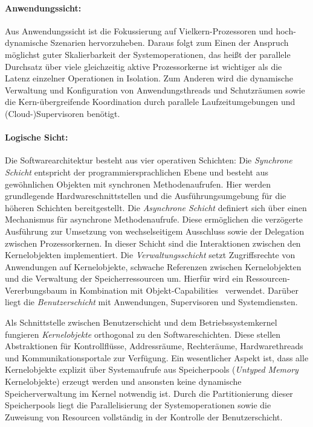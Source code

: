 \paragraph{Anwendungssicht:}
Aus Anwendungssicht ist die Fokussierung auf Vielkern-Prozessoren und hoch-dynamische Szenarien hervorzuheben. Daraus folgt zum Einen der Anspruch möglichst guter Skalierbarkeit der Systemoperationen, das heißt der parallele Durchsatz über viele gleichzeitig aktive Prozessorkerne ist wichtiger als die Latenz einzelner Operationen in Isolation. Zum Anderen wird die dynamische Verwaltung und Konfiguration von Anwendungsthreads und Schutzräumen sowie die Kern-übergreifende Koordination durch parallele Laufzeitumgebungen und (Cloud-)Supervisoren benötigt.

\paragraph{Logische Sicht:}
Die Softwarearchitektur besteht aus vier operativen Schichten: Die \emph{Synchrone Schicht} entspricht der programmiersprachlichen Ebene und besteht aus gewöhnlichen Objekten mit synchronen Methodenaufrufen. Hier werden grundlegende Hardwareschnittstellen und die Ausführungsumgebung für die höheren Schichten bereitgestellt. Die \emph{Asynchrone Schicht} definiert sich über einen Mechanismus für asynchrone Methodenaufrufe. Diese ermöglichen die verzögerte Ausführung zur Umsetzung von wechselseitigem Ausschluss sowie der Delegation zwischen Prozessorkernen. In dieser Schicht sind die Interaktionen zwischen den Kernelobjekten implementiert. Die \emph{Verwaltungsschicht} setzt Zugriffsrechte von Anwendungen auf Kernelobjekte, schwache Referenzen zwischen Kernelobjekten und die Verwaltung der Speicherressourcen um. Hierfür wird ein Ressourcen-Vererbungsbaum in Kombination mit Objekt-Capabilities~\cite{Miller2005} verwendet. Darüber liegt die \emph{Benutzerschicht} mit Anwendungen, Supervisoren und Systemdiensten. 

Als Schnittstelle zwischen Benutzerschicht und dem Betriebssystemkernel fungieren \emph{Kernelobjekte}
orthogonal zu den Softwareschichten. Diese stellen Abstraktionen für Kontrollflüsse, Addressräume, Rechteräume, Hardwarethreads und Kommunikationsportale zur Verfügung. Ein wesentlicher Aspekt ist, dass alle Kernelobjekte explizit über Systemaufrufe aus Speicherpools (\emph{Untyped Memory} Kernelobjekte) erzeugt werden und ansonsten keine dynamische Speicherverwaltung im Kernel notwendig ist. Durch die Partitionierung dieser Speicherpools liegt die Parallelisierung der Systemoperationen sowie die Zuweisung von Resourcen vollständig in der Kontrolle der Benutzerschicht.  


